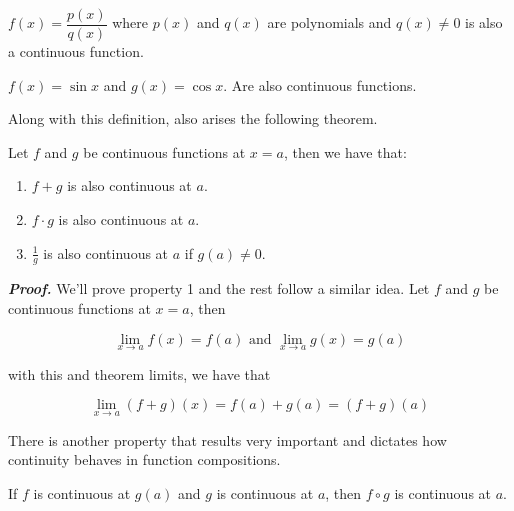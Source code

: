 \documentclass{report}
\begin{document}
\begin{Example}
    $f(x) = \dfrac{p(x)}{q(x)}$ where $p(x)$ and $q(x)$ are polynomials and $q(x) \not = 0$ is also a continuous function.
\end{Example}

\begin{Example}
    $f(x) = \sin x$ and $g(x) = \cos x$. Are also continuous functions.
\end{Example}

Along with this definition, also arises the following theorem.\\

\begin{thBox}
    Let $f$ and $g$ be continuous functions at $x=a$, then we have that:

    \begin{enumerate}
        \item $f+g$ is also continuous at $a$.
        \item $f\cdot g$ is also continuous at $a$.
        \item $\frac{1}{g}$ is also continuous at $a$ if $g(a) \not = 0$.
    \end{enumerate}
\end{thBox}

\textit{\textbf{Proof.}} We'll prove property 1 and the rest follow a similar idea. Let $f$ and $g$ be continuous functions at $x=a$, then

$$
    \lim_{x\to a} f(x) = f(a) \text{ and } \lim_{x\to a} g(x) = g(a)
$$

with this and theorem limits, we have that

$$
    \lim_{x \to a} (f+g)(x) = f(a) + g(a) = (f+g)(a)
$$

There is another property that results very important and dictates how continuity behaves in function compositions.\\

\begin{thBox}
    If $f$ is continuous at $g(a)$ and $g$ is continuous at $a$, then $f \circ g$ is continuous at $a$.
\end{thBox}
\end{document}
